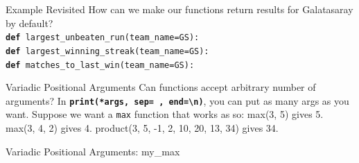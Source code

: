         \begin{frame}{Example Revisited}
            \LARGE
            How can we make our functions return results for Galatasaray by default?\\ \pause
            \texttt{\textbf{def} largest\_unbeaten\_run(team\_name\pause =\textquotesingle GS\textquotesingle):}\\ \pause
            \texttt{\textbf{def} largest\_winning\_streak(team\_name=\textquotesingle GS\textquotesingle):}\\ \pause
            \texttt{\textbf{def} matches\_to\_last\_win(team\_name=\textquotesingle GS\textquotesingle):}\\
        \end{frame}

        \begin{frame}{Variadic Positional Arguments}
            \pause
            \LARGE
            Can functions accept arbitrary number of arguments?
            \newline
            In \textbf{\texttt{print(*args, sep=\textquotesingle \ \textquotesingle, end=\textquotesingle \textbackslash n\textquotesingle )}}, 
            you can put as many args as you want.
            \pause
            \newline 
            \newline Suppose we want a \texttt{max} function that works as so:
            \newline max(3, 5) gives 5.
            \newline max(3, 4, 2) gives 4.
            \newline product(3, 5, -1, 2, 10, 20, 13, 34) gives 34.
            \newline 
        \end{frame}

        \begin{frame}{Variadic Positional Arguments: my\_max}
          \pause
          \large
          \inputminted[frame=single,framesep=2pt]{python3}{code-examples/variadic.py}
        \end{frame}

